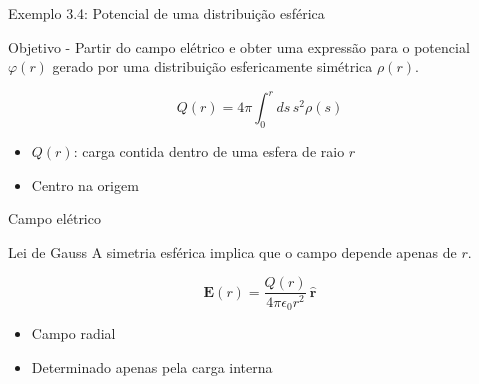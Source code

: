 \documentclass[aspectratio=169,11pt]{beamer}
\begin{document}
\begin{frame}{Exemplo 3.4: Potencial de uma distribuição esférica}

\begin{mybox}{Objetivo - }
Partir do campo elétrico e obter uma expressão para o potencial
\(\varphi(r)\) gerado por uma distribuição esfericamente simétrica \(\rho(r)\).
\end{mybox}

\begin{eqbox}
\begin{equation}
Q(r) = 4\pi \int_0^r ds\, s^2 \rho(s)
\end{equation}
\end{eqbox}

\begin{itemize}
\item \(Q(r)\): carga contida dentro de uma esfera de raio \(r\)
\item Centro na origem
\end{itemize}

\end{frame}

\begin{frame}{Campo elétrico}

\begin{mybox}{Lei de Gauss}
A simetria esférica implica que o campo depende apenas de \(r\).
\end{mybox}

\begin{eqbox}
\begin{equation}
\mathbf{E}(r) = \frac{Q(r)}{4\pi \epsilon_0 r^2}\,\hat{\mathbf r}
\end{equation}
\end{eqbox}

\begin{itemize}
\item Campo radial
\item Determinado apenas pela carga interna
\end{itemize}

\end{frame}
\end{document}

